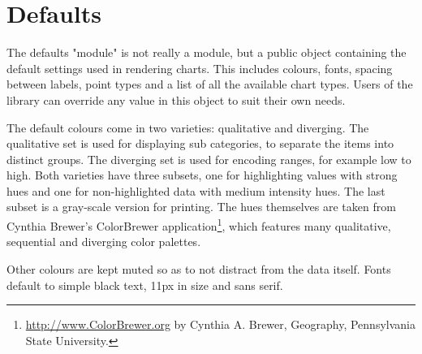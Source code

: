 \section{Defaults}
The defaults "module" is not really a module, but a public object containing the default settings used in rendering charts. This includes colours, fonts, spacing between labels, point types and a list of all the available chart types. Users of the library can override any value in this object to suit their own needs.

The default colours come in two varieties: qualitative and diverging\cite{few08}. The qualitative set is used for displaying sub categories, to separate the items into distinct groups. The diverging set is used for encoding ranges, for example low to high. Both varieties have three subsets, one for highlighting values with strong hues and one for non-highlighted data with medium intensity hues. The last subset is a gray-scale version for printing. The hues themselves are taken from Cynthia Brewer's ColorBrewer application\footnote{\url{http://www.ColorBrewer.org} by Cynthia A. Brewer, Geography, Pennsylvania State University.}, which features many qualitative, sequential and diverging color palettes.

Other colours are kept muted \cite{tufte01, few08, stone06} so as to not distract from the data itself. Fonts default to simple black text, 11px in size and sans serif.




